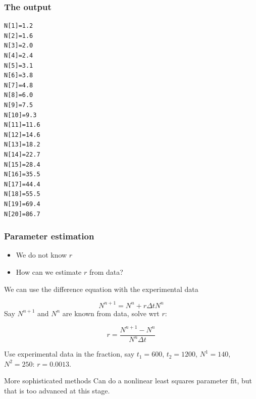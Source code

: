 \documentclass{beamer}
\begin{document}
\begin{frame}
\frametitle{The output}

\begin{Verbatim}[numbers=none,fontsize=\fontsize{9pt}{9pt},baselinestretch=0.95]
N[1]=1.2
N[2]=1.6
N[3]=2.0
N[4]=2.4
N[5]=3.1
N[6]=3.8
N[7]=4.8
N[8]=6.0
N[9]=7.5
N[10]=9.3
N[11]=11.6
N[12]=14.6
N[13]=18.2
N[14]=22.7
N[15]=28.4
N[16]=35.5
N[17]=44.4
N[18]=55.5
N[19]=69.4
N[20]=86.7
\end{Verbatim}
\end{frame}

\begin{frame}
\frametitle{Parameter estimation}

\begin{block}{}
\begin{itemize}
 \item We do not know $r$

 \item How can we estimate $r$ from data?
\end{itemize}

\noindent
We can use the difference equation with the experimental data

\[ N^{n+1} = N^n + r\Delta t N^n\]
Say $N^{n+1}$ and $N^n$ are known from data, solve wrt $r$:

\[ r = \frac{N^{n+1}-N^n}{N^n\Delta t} \]

Use experimental data in the fraction, say $t_1=600$, $t_2=1200$,
$N^1=140$, $N^2=250$: $r=0.0013$.
\end{block}

\begin{block}{More sophisticated methods }
Can do a nonlinear least squares parameter fit, but that is
too advanced at this stage.
\end{block}
\end{frame}
\end{document}
